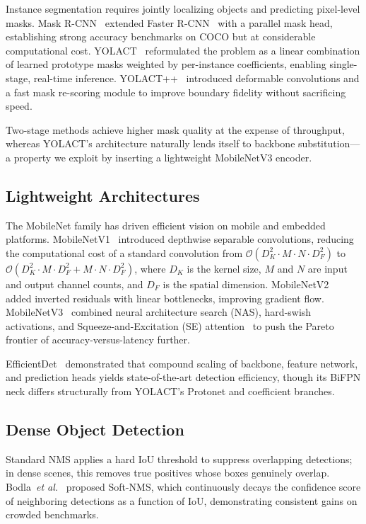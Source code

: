 \documentclass[conference]{IEEEtran}
\newcommand{\etal}{\emph{et al.}}
\begin{document}
Instance segmentation requires jointly localizing objects and predicting
pixel-level masks. Mask R-CNN~\cite{he2017mask} extended Faster
R-CNN~\cite{ren2015faster} with a parallel mask head, establishing
strong accuracy benchmarks on COCO but at considerable computational
cost. YOLACT~\cite{bolya2019yolact} reformulated the problem as a
linear combination of learned prototype masks weighted by per-instance
coefficients, enabling single-stage, real-time inference.
YOLACT++~\cite{bolya2020yolact} introduced deformable convolutions and a
fast mask re-scoring module to improve boundary fidelity without
sacrificing speed.

Two-stage methods achieve higher mask quality at the expense of
throughput, whereas YOLACT's architecture naturally lends itself to
backbone substitution---a property we exploit by inserting a lightweight
MobileNetV3 encoder.

\subsection{Lightweight Architectures}

The MobileNet family has driven efficient vision on mobile and embedded
platforms. MobileNetV1~\cite{howard2017mobilenets} introduced
depthwise separable convolutions, reducing the computational cost of a
standard convolution from $\mathcal{O}(D_K^2 \cdot M \cdot N \cdot D_F^2)$
to $\mathcal{O}(D_K^2 \cdot M \cdot D_F^2 + M \cdot N \cdot D_F^2)$,
where $D_K$ is the kernel size, $M$ and $N$ are input and output channel
counts, and $D_F$ is the spatial dimension. MobileNetV2~\cite{sandler2018mobilenetv2}
added inverted residuals with linear bottlenecks, improving gradient flow.
MobileNetV3~\cite{howard2019mobilenetv3} combined neural architecture
search (NAS), hard-swish activations, and Squeeze-and-Excitation (SE)
attention~\cite{hu2018squeeze} to push the Pareto frontier of
accuracy-versus-latency further.

EfficientDet~\cite{tan2020efficientdet} demonstrated that compound
scaling of backbone, feature network, and prediction heads yields
state-of-the-art detection efficiency, though its BiFPN neck differs
structurally from YOLACT's Protonet and coefficient branches.

\subsection{Dense Object Detection}

Standard NMS applies a hard IoU threshold to suppress overlapping
detections; in dense scenes, this removes true positives whose boxes
genuinely overlap. Bodla~\etal~\cite{bodla2017soft} proposed
Soft-NMS, which continuously decays the confidence score of neighboring
detections as a function of IoU, demonstrating consistent gains on
crowded benchmarks.
\end{document}
